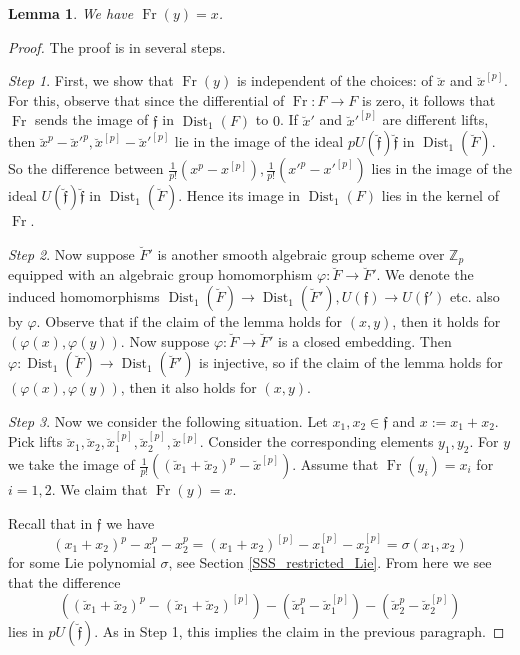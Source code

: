 \documentclass{amsart}
\newtheorem{Lem}[Thm]{Lemma}
\theoremstyle{definition}
\newcommand{\Z}{\mathbb{Z}}
\newcommand{\ff}{\mathfrak{f}}
\numberwithin{equation}{section}
\begin{document}
\begin{Lem}\label{Lem:Fr_image}
We have $\operatorname{Fr}(y)=x$. 
\end{Lem}
\begin{proof}
The proof is in several steps. 

{\it Step 1}. First, we show that $\operatorname{Fr}(y)$ is independent of the choices: of $\breve{x}$ and $\breve{x}^{[p]}$. 
For this, observe that since the differential of $\operatorname{Fr}: F\rightarrow F$ is zero, it follows that $\operatorname{Fr}$ sends the image of $\ff$ in $\operatorname{Dist}_1(F)$ to $0$. If $\breve{x}'$ and $\breve{x}'^{[p]}$ are different lifts, then $\breve{x}^p-\breve{x}'^p, \breve{x}^{[p]}-\breve{x}'^{[p]}$ lie in the image of the ideal $p U(\breve{\ff})\breve{\ff}$ in $\operatorname{Dist}_1(\breve{F})$. So the difference between $\frac{1}{p!}(x^p-x^{[p]}), 
\frac{1}{p!}(x'^p-x'^{[p]})$ lies in the image of the ideal $U(\breve{\ff})\breve{\ff}$ in $\operatorname{Dist}_1(\breve{F})$. Hence its image in $\operatorname{Dist}_1(F)$ lies in the kernel of $\operatorname{Fr}$. 

{\it Step 2}. Now suppose $\breve{F}'$ is another smooth algebraic group scheme over $\Z_p$ equipped with an algebraic group homomorphism $\varphi: \breve{F}\rightarrow \breve{F}'$. We denote the induced homomorphisms $\operatorname{Dist}_1(\breve{F})\rightarrow \operatorname{Dist}_1(\breve{F}'), U(\ff)\rightarrow U(\ff')$ etc. also by $\varphi$. Observe that if the claim of the lemma holds for $(x,y)$, then it holds for $(\varphi(x), \varphi(y))$. Now suppose $\varphi:\breve{F}\rightarrow \breve{F}'$ is a closed embedding. 
Then $\varphi: \operatorname{Dist}_1(\breve{F})\rightarrow \operatorname{Dist}_1(\breve{F}')$ is injective, so if the claim of the lemma holds for $(\varphi(x),\varphi(y))$, then it also holds for $(x,y)$.

{\it Step 3}. Now we consider the following situation. Let $x_1,x_2\in \ff$ and $x:=x_1+x_2$.
Pick lifts $\breve{x}_1,\breve{x}_2, \breve{x}_1^{[p]},\breve{x}_2^{[p]}, \breve{x}^{[p]}$. Consider the corresponding elements $y_1,y_2$. For $y$ we take the image of 
$\frac{1}{p!}((\breve{x}_1+\breve{x}_2)^p-\breve{x}^{[p]})$. Assume that $\operatorname{Fr}(y_i)=x_i$ for $i=1,2$. We claim that $\operatorname{Fr}(y)=x$.

Recall that in $\ff$ we have 
$$(x_1+x_2)^p-x_1^p-x_2^p=(x_1+x_2)^{[p]}-x_1^{[p]}-x_2^{[p]}=\sigma(x_1,x_2)$$
for some Lie polynomial $\sigma$, see Section \ref{SSS_restricted_Lie}. From here we see that the difference 
$$\left((\breve{x}_1+\breve{x}_2)^p-(\breve{x}_1+\breve{x}_2)^{[p]}\right)-(\breve{x}_1^p-\breve{x}_1^{[p]})-(\breve{x}_2^p-\breve{x}_2^{[p]})$$
lies in $p U(\breve{\ff})$. As in Step 1, this implies the claim in the previous paragraph.


\end{proof}
\end{document}
